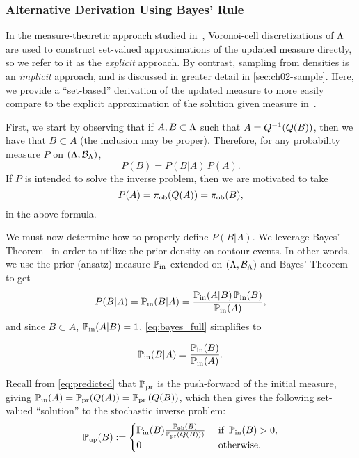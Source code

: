 \subsubsection{Alternative Derivation Using Bayes' Rule}\label{sec:set_bayes}
In the measure-theoretic approach studied in~\cite{BBE11, BET+14}, Voronoi-cell discretizations of ${\Lambda}$ are used to construct set-valued approximations of the updated measure directly, so we refer to it as the \emph{explicit} approach.
By contrast, sampling from densities is an \emph{implicit} approach, and is discussed in greater detail in \ref{sec:ch02-sample}.
Here, we provide a ``set-based'' derivation of the updated measure to more easily compare to the explicit approximation of the solution given measure in~\cite{BET+14}.

First, we start by observing that if $A, B \subset {\Lambda}$ such that $A = Q^{-1}(Q(B))$, then we have that $B\subset A$ (the inclusion may be proper).
Therefore, for any probability measure $P$ on $({\Lambda}, \mathcal{B}_{{\Lambda}})$, 
\[
P(B) = P(B|A) \, P(A).
\]
If $P$ is intended to solve the inverse problem, then we are motivated to take
\[
P(A) = \operatorname*{\pi_{ob}} (Q(A)) = \operatorname*{\pi_{ob}} (B),
\]
in the above formula.

We must now determine how to properly define $P(B|A)$. 
We leverage Bayes' Theorem~\cite{Smith} in order to utilize the prior density on contour events.
In other words, we use the prior (ansatz) measure $\operatorname*{\mathbb{P}_{in}}$ extended on $({\Lambda}, \mathcal{B}_{{\Lambda}})$ and Bayes' Theorem to get
\begin{equation}\label{eq:bayes_full}
P(B|A) = \operatorname*{\mathbb{P}_{in}}(B|A) = \frac{ \operatorname*{\mathbb{P}_{in}}(A|B) \operatorname*{\mathbb{P}_{in}}(B) }{ \operatorname*{\mathbb{P}_{in}}(A) },
\end{equation}
and since $B \subset A$, $\operatorname*{\mathbb{P}_{in}}(A|B) = 1$, \eqref{eq:bayes_full} simplifies to

\begin{equation}\label{eq:bayes}
\operatorname*{\mathbb{P}_{in}}(B|A) = \frac{ \operatorname*{\mathbb{P}_{in}}(B) }{ \operatorname*{\mathbb{P}_{in}}(A) }.
\end{equation}

Recall from \eqref{eq:predicted} that $\operatorname*{\mathbb{P}_{pr}}$ is the push-forward of the initial measure, giving $\operatorname*{\mathbb{P}_{in}}(A) = \operatorname*{\mathbb{P}_{pr}} (Q(A)) = \operatorname*{\mathbb{P}_{pr}} \left (Q(B)\right )$, which then gives the following set-valued ``solution'' to the stochastic inverse problem:
\begin{equation}\label{eq:sip_sol_cont}
\operatorname*{\mathbb{P}_{up}}(B) := \begin{cases}
\operatorname*{\mathbb{P}_{in}}(B) \frac{ \operatorname*{\mathbb{P}_{ob}}(B) }{ \operatorname*{\mathbb{P}_{pr}} \left (Q(B)\right ) ) } & \text{ if } \operatorname*{\mathbb{P}_{in}}(B) > 0,\\
0 & \text{ otherwise}.
\end{cases}
\end{equation}

